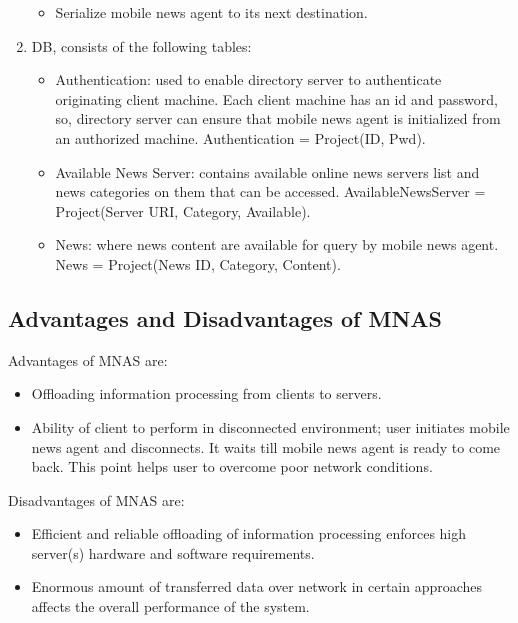 \documentclass[12pt,a4paper,final,twoside,onecolumn,titlepage]{book}
\begin{document}
\begin{enumerate}
\begin{itemize}
\item Serialize mobile news agent to its next destination.
\end{itemize}
\item \gls{DB}, consists of the following tables:
\begin{itemize}
\item Authentication: used to enable directory server to authenticate originating client machine. Each client machine has an id and password, so, directory server can ensure that mobile news agent is initialized from an authorized machine. Authentication = Project(ID, Pwd).
\item Available News Server: contains available online news servers list and news categories on them that can be accessed. AvailableNewsServer = Project(Server URI, Category, Available).
\item News: where news content are available for query by mobile news agent. News = Project(News ID, Category, Content).
\end{itemize}
\end{enumerate}

\subsection{Advantages and Disadvantages of MNAS}
Advantages of \gls{MNAS} are:
\begin{itemize}
\item Offloading information processing from clients to servers.
\item Ability of client to perform in disconnected environment; user initiates mobile news agent and disconnects. It waits till mobile news agent is ready to come back. This point helps user to overcome poor network conditions.
\end{itemize}
Disadvantages of \gls{MNAS} are:
\begin{itemize}
\item Efficient and reliable offloading of information processing enforces high server(s) hardware and software requirements.
\item Enormous amount of transferred data over network in certain approaches affects the overall performance of the system.
\end{itemize}
\end{document}
